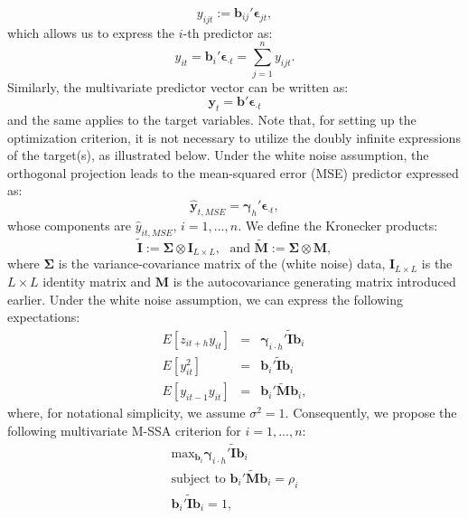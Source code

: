 \documentclass[11pt,a4paper]{article}
\begin{document}
\[
y_{ijt} := \mathbf{b}_{ij}'\boldsymbol{\epsilon}_{jt},
\]
which allows us to express the $i$-th predictor as:
\[
y_{it} = \mathbf{b}_i'\boldsymbol{\epsilon}_{\cdot t} = \sum_{j=1}^n y_{ijt}.
\] 
Similarly, the multivariate predictor vector can be written as:
\[
\mathbf{y}_t = \mathbf{b}'\boldsymbol{\epsilon}_{\cdot t}
\]
and the same applies to the target variables. Note that, for setting up the optimization criterion, it is not necessary to utilize the doubly infinite expressions of the target(s), as illustrated below. Under the white noise assumption, the orthogonal projection leads to the mean-squared error (MSE) predictor expressed as:
\[
\hat{\mathbf{y}}_{t,MSE} = \boldsymbol{\gamma}_{h}'\boldsymbol{\epsilon}_{\cdot t},
\]
whose components are $\hat{y}_{it,MSE}$, $i=1,...,n$. We define the Kronecker products: 
\[
\tilde{\mathbf{I}}:=\boldsymbol{\Sigma}\otimes\mathbf{I}_{L\times L},\textrm{ ~and~} \tilde{\mathbf{M}}:=\boldsymbol{\Sigma}\otimes\mathbf{M},
\]
where $\boldsymbol{\Sigma}$ is the variance-covariance matrix of the (white noise) data,  $\mathbf{I}_{L\times L}$ is the  $L\times L$ identity matrix  and  $\mathbf{M}$ is the autocovariance generating matrix introduced earlier. Under the white noise assumption, we can express the following expectations: 
\begin{eqnarray}
E[z_{it+h}y_{it}]&=&\boldsymbol{\gamma}_{i\cdot h}'\tilde{\mathbf{I}}\mathbf{b}_{i}\nonumber\\%
E[y_{it}^2]&=&\mathbf{b}_{i}'\tilde{\mathbf{I}}\mathbf{b}_{i}\nonumber\\%
E[y_{it-1}y_{it}]&=&\mathbf{b}_{i}'\tilde{\mathbf{M}}\mathbf{b}_{i},\nonumber
\end{eqnarray}
where, for notational simplicity, we assume $\sigma^2=1$. 
Consequently, we propose the following multivariate M-SSA criterion for $i=1,...,n$: 
\begin{eqnarray}\label{mcrit1}
\textrm{max}_{\mathbf{b}_i}\boldsymbol{\gamma}_{i\cdot h}'\tilde{\mathbf{I}}\mathbf{b}_{i}\\
\textrm{subject~to~}\mathbf{b}_{i}'\tilde{\mathbf{M}}\mathbf{b}_{i}=\rho_i\nonumber\\
\mathbf{b}_{i}'\tilde{\mathbf{I}}\mathbf{b}_{i}=1,\nonumber
\end{eqnarray}
\end{document}

